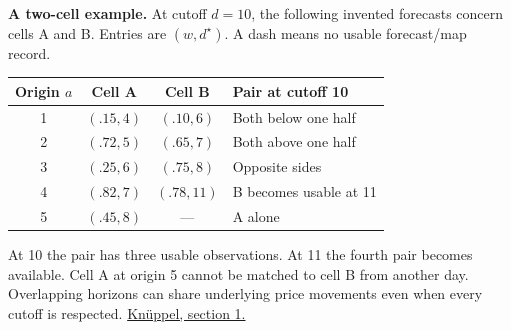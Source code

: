 \documentclass[11pt,letterpaper]{article}
\newcommand{\lead}[1]{\textbf{\textcolor{accent}{#1}}}
\newcommand{\src}[2]{\href{#1}{#2}}
\begin{document}
\lead{A two-cell example.} At cutoff \(d=10\), the following invented forecasts concern cells A and B. Entries are \((w,d^\star)\). A dash means no usable forecast/map record.
\begin{center}\begin{tabular}{@{}c c c l@{}}\toprule
Origin \(a\)&Cell A&Cell B&Pair at cutoff 10\\ \midrule
1 & \((.15,4)\) & \((.10,6)\) & Both below one half\\
2 & \((.72,5)\) & \((.65,7)\) & Both above one half\\
3 & \((.25,6)\) & \((.75,8)\) & Opposite sides\\
4 & \((.82,7)\) & \((.78,11)\) & B becomes usable at 11\\
5 & \((.45,8)\) & --- & A alone\\ \bottomrule
\end{tabular}\end{center}
At 10 the pair has three usable observations. At 11 the fourth pair becomes available. Cell A at origin 5 cannot be matched to cell B from another day. Overlapping horizons can share underlying price movements even when every cutoff is respected. \src{https://www.bundesbank.de/resource/blob/635436/766e285ef812d86d49c02dd8033d7333/472B63F073F071307366337C94F8C870/2012-06-01-eltville-02-knueppel-paper-data.pdf}{Kn\"uppel, section 1.}
\end{document}
